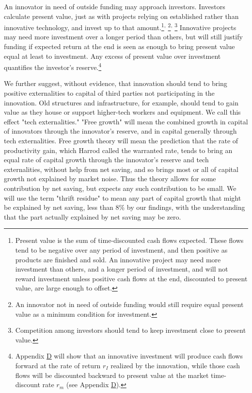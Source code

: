 \documentclass[a4padisinvitingper,fleqn]{latex_styles/cas-sc}
\begin{document}
An innovator in need of outside funding may approach investors. Investors calculate present value, just as with projects relying on established rather than innovative technology, and invest up to that amount.\footnote{Present value is the sum of time-discounted cash flows expected. These flows tend to be negative over any period of investment, and then positive as products are finished and sold. An innovative project may need more investment than others, and a longer period of investment, and will not reward investment unless positive cash flows at the end, discounted to present value, are large enough to offset.}\textsuperscript{,}%
\footnote{An innovator not in need of outside funding would still require equal present value as a minimum condition for investment.}\textsuperscript{,}%
\footnote{Competition among investors should tend to keep investment close to present value.} Innovative projects may need more investment over a longer period than others, but will still justify funding if expected return at the end is seen as enough to bring present value equal at least to investment. Any excess of present value over investment quantifies the investor's reserve.\footnote{Appendix \hyperref[appendix-d]{D} will show that an innovative investment will produce cash flows forward at the rate of return \(r_I\) realized by the innovation, while those cash flows will be discounted backward to present value at the market time-discount rate \(r_m\) (see Appendix \hyperref[appendix-d]{D}).} 

We further suggest, without evidence,
that innovation should tend to bring positive
externalities to capital of third parties
not participating in the innovation. Old
structures and infrastructure, for example,
should tend to gain value as they house or 
support higher-tech workers and equipment.
We call this effect "tech externalities."
"Free growth" will mean the combined growth in capital
of innovators through the innovator's reserve,
and in capital generally through tech externalities.
Free growth theory will mean the prediction 
that the rate of productivity gain, which Harrod called the warranted rate, tends to bring an equal rate of capital growth through the innovator's reserve and tech externalities, without help from net saving, and so brings most or all of capital growth not explained by market noise. Thus the theory allows for some contribution by net saving, but expects any such contribution to be small. We will use the term "thrift residue" to mean any part of capital growth that might be explained by net saving, less than 8\% by our findings, with the understanding that the part actually explained by net saving may be zero.
\end{document}
